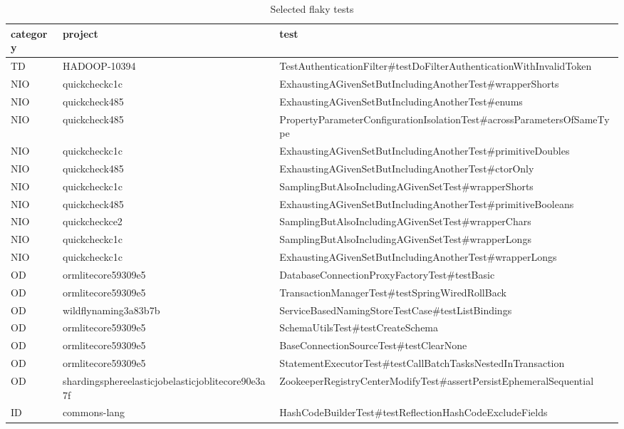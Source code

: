 \begin{table}[t]
\centering\small
\caption{Selected flaky tests}
\label{tab:selected_tests}
\begin{tabular}{lll}
\toprule
\textbf{category} & \textbf{project} & \textbf{test} \\
\midrule
TD & HADOOP-10394 & TestAuthenticationFilter\#testDoFilterAuthenticationWithInvalidToken \\
NIO & quickcheckc1c & ExhaustingAGivenSetButIncludingAnotherTest\#wrapperShorts \\
NIO & quickcheck485 & ExhaustingAGivenSetButIncludingAnotherTest\#enums \\
NIO & quickcheck485 & PropertyParameterConfigurationIsolationTest\#acrossParametersOfSameType \\
NIO & quickcheckc1c & ExhaustingAGivenSetButIncludingAnotherTest\#primitiveDoubles \\
NIO & quickcheck485 & ExhaustingAGivenSetButIncludingAnotherTest\#ctorOnly \\
NIO & quickcheckc1c & SamplingButAlsoIncludingAGivenSetTest\#wrapperShorts \\
NIO & quickcheck485 & ExhaustingAGivenSetButIncludingAnotherTest\#primitiveBooleans \\
NIO & quickcheckce2 & SamplingButAlsoIncludingAGivenSetTest\#wrapperChars \\
NIO & quickcheckc1c & SamplingButAlsoIncludingAGivenSetTest\#wrapperLongs \\
NIO & quickcheckc1c & ExhaustingAGivenSetButIncludingAnotherTest\#wrapperLongs \\
OD & ormlitecore59309e5 & DatabaseConnectionProxyFactoryTest\#testBasic \\
OD & ormlitecore59309e5 & TransactionManagerTest\#testSpringWiredRollBack \\
OD & wildflynaming3a83b7b & ServiceBasedNamingStoreTestCase\#testListBindings \\
OD & ormlitecore59309e5 & SchemaUtilsTest\#testCreateSchema \\
OD & ormlitecore59309e5 & BaseConnectionSourceTest\#testClearNone \\
OD & ormlitecore59309e5 & StatementExecutorTest\#testCallBatchTasksNestedInTransaction \\
OD & shardingsphereelasticjobelasticjoblitecore90e3a7f & ZookeeperRegistryCenterModifyTest\#assertPersistEphemeralSequential \\
ID & commons-lang & HashCodeBuilderTest\#testReflectionHashCodeExcludeFields \\

\end{tabular}
\end{table}
